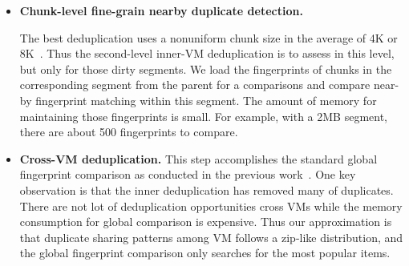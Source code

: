 {\begin{itemize}
\item \textbf{Chunk-level fine-grain nearby duplicate detection.}

The best deduplication uses a nonuniform chunk size 
in the average of 4K or 8K~\cite{??}.
Thus the second-level inner-VM deduplication is to assess in this
level, but only for those dirty  segments. 
We load the fingerprints of chunks in the corresponding segment from the
parent for a comparisons and compare near-by fingerprint matching within this segment.
The amount of memory for maintaining those fingerprints  is small.
For example, with a 2MB segment, there are about 500 fingerprints to compare.


%

%

\item \textbf{Cross-VM deduplication.}
This step accomplishes the standard global fingerprint  comparison as conducted
in the previous work~\cite{??}.
One key observation is that the inner deduplication has removed many of duplicates.
There are not lot of deduplication opportunities cross VMs while the memory
consumption for global comparison is expensive.
Thus our approximation is that duplicate sharing patterns among  VM follows
a zip-like distribution, and the global fingerprint  comparison  only searches
for the most popular items. 
\end{itemize}

}
